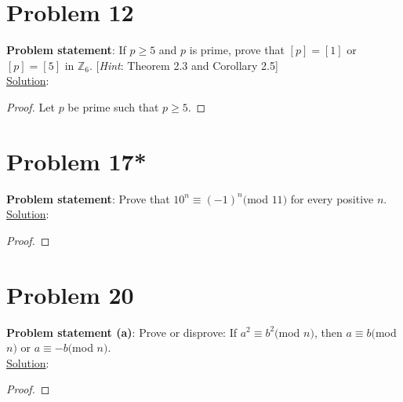 \documentclass{article} %
\begin{document}
\newpage

\section*{Problem 12}


\textbf{Problem statement}: If $p \geq 5$ and $p$ is prime, prove that $[p] = [1]$ or $[p] = [5]$ in $\mathbb{Z}_6$. [\textit{Hint}: Theorem 2.3 and Corollary 2.5]
\\

\underline{Solution}: 
\begin{addmargin}[1em]{0em}
\begin{proof}
Let $p$ be prime such that $p \geq 5$.
\end{proof}
\end{addmargin}

\newpage

\section*{Problem 17*}


\textbf{Problem statement}: Prove that $10^n \equiv (-1)^n($mod $ 11)$ for every positive $n$.
\\

\underline{Solution}: 
\begin{addmargin}[1em]{0em}
\begin{proof}

\end{proof}
\end{addmargin}

\newpage

\section*{Problem 20}


\textbf{Problem statement (a)}: Prove or disprove: If $a^2 \equiv b^2 ($mod $n)$, then $a \equiv b($mod $ n)$ or $a \equiv -b($mod $n)$. 
\\

\underline{Solution}: 
\begin{addmargin}[1em]{0em}
\begin{proof}

\end{proof}
\end{addmargin}
\end{document}
